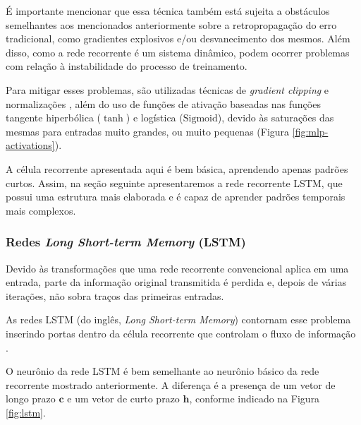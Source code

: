 \documentclass[a4paper, 12pt]{article}
\newcommand{\sigmoid}{\text{Sigmoid}}
\begin{document}
É importante mencionar que essa técnica também está sujeita a obstáculos semelhantes aos mencionados anteriormente sobre a retropropagação do erro tradicional, como gradientes explosivos e/ou desvanecimento dos mesmos. Além disso, como a rede recorrente é um sistema dinâmico, podem ocorrer problemas com relação à instabilidade do processo de treinamento. 

Para mitigar esses problemas, são utilizadas técnicas de \textit{gradient clipping} e normalizações \cite{geron2019hands}, além do uso de funções de ativação baseadas nas funções tangente hiperbólica ($\tanh$) e logística ($\sigmoid$), devido às saturações das mesmas para entradas muito grandes, ou muito pequenas (Figura \ref{fig:mlp-activations}).

A célula recorrente apresentada aqui é bem básica, aprendendo apenas padrões curtos. Assim, na seção seguinte apresentaremos a rede recorrente LSTM, que possui uma estrutura mais elaborada e é capaz de aprender padrões temporais mais complexos.

\subsubsection{Redes \textit{Long Short-term Memory} (LSTM)}

Devido às transformações que uma rede recorrente convencional aplica em uma entrada, parte da informação original transmitida é perdida e, depois de várias iterações, não sobra traços das primeiras entradas.

As redes LSTM (do inglês, \textit{Long Short-term Memory}) contornam esse problema inserindo portas dentro da célula recorrente que controlam o fluxo de informação \cite{greff2016lstm}.

O neurônio da rede LSTM é bem semelhante ao neurônio básico da rede recorrente mostrado anteriormente. A diferença é a presença de um vetor de longo prazo $\mathbf{c}$ e um vetor de curto prazo $\mathbf{h}$, conforme indicado na Figura \ref{fig:lstm}.
\end{document}

